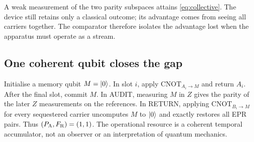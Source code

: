 A weak measurement of the two parity subspaces attains \eqref{eq:collective}. The device still retains only a classical outcome; its advantage comes from seeing all carriers together. The comparator therefore isolates the advantage lost when the apparatus must operate as a stream.

\subsection{One coherent qubit closes the gap}

Initialise a memory qubit $M=\lvert 0\rangle$. In slot $i$, apply $\mathrm{CNOT}_{A_i\rightarrow M}$ and return $A_i$. After the final slot, commit $M$.
In AUDIT, measuring $M$ in $Z$ gives the parity of the later $Z$ measurements on the references. In RETURN, applying $\mathrm{CNOT}_{B_i\rightarrow M}$ for every sequestered carrier uncomputes $M$ to $\lvert 0\rangle$ and exactly restores all EPR pairs. Thus $(P_{\mathrm A},F_{\mathrm R})=(1,1)$. The operational resource is a coherent temporal accumulator, not an observer or an interpretation of quantum mechanics.
